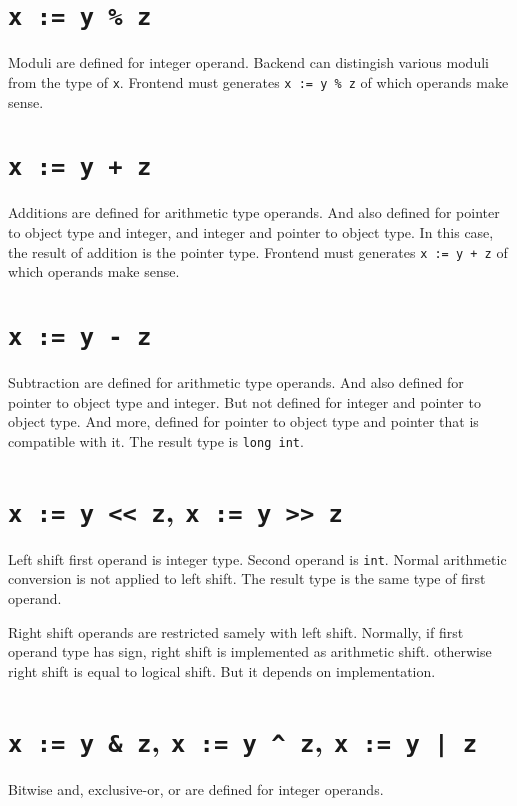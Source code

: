 \section{{\tt{x := y \% z}}}

Moduli are defined for integer operand.
Backend can distingish various moduli from the type of {\tt{x}}.
Frontend must generates {\tt{x := y \% z}} of which operands make sense.

\section{{\tt{x := y + z}}}

Additions are defined for arithmetic type operands.
And also defined for pointer to object type
and integer, and integer and pointer to object type.
In this case, the result of addition is the pointer type.
Frontend must generates {\tt{x := y + z}} of which operands make sense.

\section{{\tt{x := y - z}}}

Subtraction are defined for arithmetic type operands.
And also defined for pointer to object type
and integer. But not defined for integer and pointer to object type.
And more, defined for pointer to object type and pointer that is
compatible with it. The result type is {\tt{long int}}.

\section{{\tt{x := y << z}}, {\tt{x := y >> z}}}

Left shift first operand is integer type. Second operand is {\tt{int}}.
Normal arithmetic conversion is not applied to left shift.
The result type is the same type of first operand.

Right shift operands are restricted samely with left shift.
Normally, if first operand type has sign, right shift 
is implemented as arithmetic shift. otherwise right shift
is equal to logical shift. But it depends on implementation.

\section{{\tt{x := y \& z}}, {\tt{x := y \^{} z}}, {\tt{x := y | z}}}

Bitwise and, exclusive-or, or are defined for integer operands.

